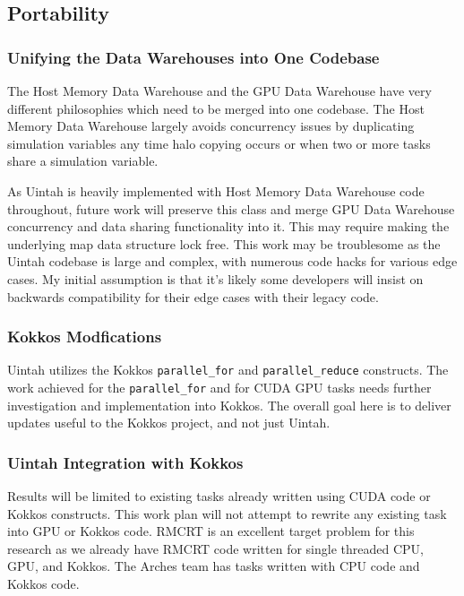 \documentclass[12pt]{article}
\begin{document}
\subsection{Portability}
\label{ch:workplan-portability}
\subsubsection{Unifying the Data Warehouses into One Codebase}
\label{ch:workplan-unified-data-warehouse}
The Host Memory Data Warehouse and the GPU Data Warehouse have very different philosophies which need to be merged into one codebase.  The Host Memory Data Warehouse largely avoids concurrency issues by duplicating simulation variables any time halo copying occurs or when two or more tasks share a simulation variable.  

As Uintah is heavily implemented with Host Memory Data Warehouse code throughout, future work will preserve this class and merge GPU Data Warehouse concurrency and data sharing functionality into it.  This may require making the underlying map data structure lock free.  This work may be troublesome as the Uintah codebase is large and complex, with numerous code hacks for various edge cases.  My initial assumption is that it's likely some developers will insist on backwards compatibility for their edge cases with their legacy code.

\subsubsection{Kokkos Modfications}
\label{ch:workplan-kokkos-modifications}
Uintah utilizes the Kokkos \texttt{parallel\_for} and \texttt{parallel\_reduce} constructs.  The work achieved for the \texttt{parallel\_for} and for CUDA GPU tasks needs further investigation and implementation into Kokkos.  The overall goal here is to deliver updates useful to the Kokkos project, and not just Uintah. 
\subsubsection{Uintah Integration with Kokkos}
\label{ch:workplan-kokkos-integration}
Results will be limited to existing tasks already written using CUDA code or Kokkos constructs.  This work plan will not attempt to rewrite any existing task into GPU or Kokkos code.   RMCRT is an excellent target problem for this research as we already have RMCRT code written for single threaded CPU, GPU, and Kokkos.  The Arches team has tasks written with CPU code and Kokkos code.  
\end{document}
